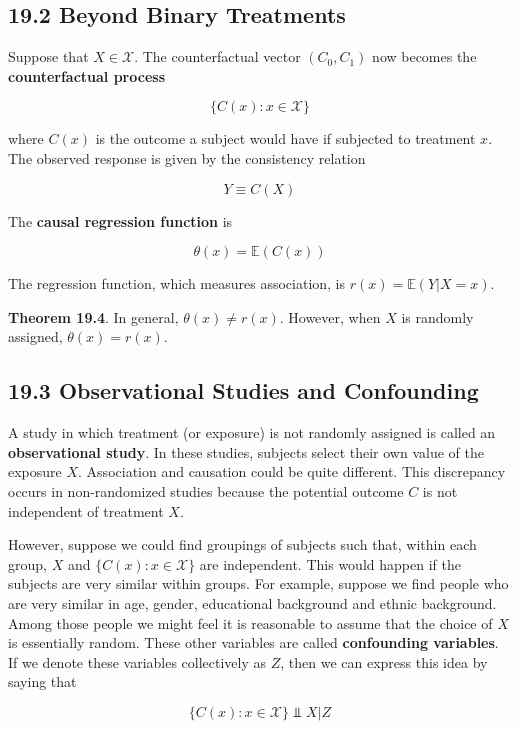 \subsection*{19.2 Beyond Binary Treatments}\label{beyond-binary-treatments}

Suppose that \(X \in \mathcal{X}\). The counterfactual vector
\((C_{0}, C_{1})\) now becomes the \textbf{counterfactual process}

\[ \{ C(x) : x \in \mathcal{X} \} \]

where \(C(x)\) is the outcome a subject would have if subjected to
treatment \(x\). The observed response is given by the consistency
relation

\[ Y \equiv C(X) \]

The \textbf{causal regression function} is

\[ \theta(x) = \mathbb{E}(C(x)) \]

The regression function, which measures association, is
\(r(x) = \mathbb{E}(Y | X = x)\).

\textbf{Theorem 19.4}. In general, \(\theta(x) \neq r(x)\). However,
when \(X\) is randomly assigned, \(\theta(x) = r(x)\).

\subsection*{19.3 Observational Studies and Confounding}\label{observational-studies-and-confounding}

A study in which treatment (or exposure) is not randomly assigned is
called an \textbf{observational study}. In these studies, subjects
select their own value of the exposure \(X\). Association and causation
could be quite different. This discrepancy occurs in non-randomized
studies because the potential outcome \(C\) is not independent of
treatment \(X\).

However, suppose we could find groupings of subjects such that, within
each group, \(X\) and \(\{ C(x) : x \in \mathcal{X} \}\) are
independent. This would happen if the subjects are very similar within
groups. For example, suppose we find people who are very similar in age,
gender, educational background and ethnic background. Among those people
we might feel it is reasonable to assume that the choice of \(X\) is
essentially random. These other variables are called \textbf{confounding
variables}. If we denote these variables collectively as \(Z\), then we
can express this idea by saying that

\[ \{ C(x) : x \in \mathcal{X} \} \text{ ⫫ } X | Z\]

